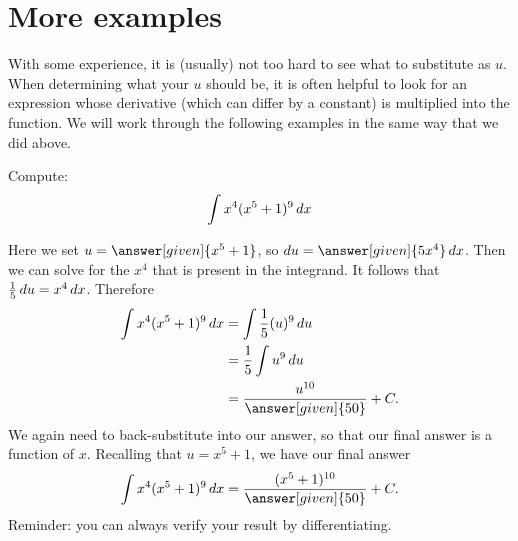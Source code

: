 \documentclass{ximera}
\begin{document}
\section{More examples}

With some experience, it is (usually) not too hard to see what to
substitute as $u$.  When determining what your $u$ should be, it is often helpful to look for an expression whose derivative (which can differ by a constant) is multiplied into the function. We will work through the following examples in the
same way that we did above.
\begin{example}
Compute:
\[
\int x^4(x^5+1)^{9} \mathop{}\!d x
\]
\begin{explanation}
Here we set $u =  \answer[given]{x^5+1}$, so $\d u =  \answer[given]{5x^4} \d x$.  Then
we can solve for the $x^4$ that is present in the integrand. It follows that $\frac{1}{5}\mathop{}\!d u=x^4\mathop{}\!d x$. Therefore
\begin{align*}
  \int x^4(x^5+1)^{9} \d x &= \int \frac{1}{5} (u)^{9} \d u \\
  &= \frac{1}{5} \int u^{9} \d u\\
&=\frac{u^{10}}{ \answer[given]{50}}+C.
\end{align*}
We again need to back-substitute into our answer, so that our final
answer is a function of $x$.  Recalling that $u= x^5+1$, we have
our final answer
\[
\int x^4(x^5+1)^{9} \d x= \frac{(x^5+1)^{10}}{\answer[given]{50}}+C.
\]
Reminder: you can always verify your result by differentiating.

\end{explanation}
\end{example}


\end{document}

